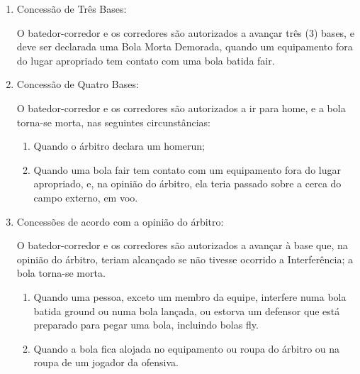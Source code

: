 \begin{multicols}{2}
\begin{enumerate}[label=\alph*)]
	\item  Concess\~ao de Tr\^es Bases: 
	
	O batedor-corredor e os corredores s\~ao autorizados a avan\c{c}ar tr\^es (3) bases, e deve ser declarada uma Bola Morta Demorada, quando um equipamento fora do lugar apropriado tem contato com uma bola batida \gls{fair}. 
	
	\item  Concess\~ao de Quatro Bases: 
	
	O batedor-corredor e os corredores s\~ao autorizados a ir para \gls{home}, e a bola torna-se morta, nas seguintes circunst\^ancias: 
	
	\begin{enumerate}[label=\roman* -]
		\item Quando o \'arbitro declara um \gls{homerun}; 
		\item Quando uma bola \gls{fair} tem contato com um equipamento fora do lugar apropriado, e, na opini\~ao do \'arbitro, ela teria passado sobre a cerca do campo externo, em voo. 
	\end{enumerate}
	\item  Concess\~oes de acordo com a opini\~ao do \'arbitro: 
	
	O batedor-corredor e os corredores s\~ao autorizados a avan\c{c}ar \`a base que, na opini\~ao 
	do \'arbitro, teriam alcan\c{c}ado se n\~ao tivesse ocorrido a Interfer\^encia; a bola torna-se morta. 
	\begin{enumerate}[label=\roman*.]
		\item Quando uma pessoa, exceto um membro da equipe, interfere numa bola batida \gls{ground} ou numa bola lan\c{c}ada, ou estorva um defensor que est\'a preparado para pegar uma bola, incluindo bolas \gls{fly}. 
		\item Quando a bola fica alojada no equipamento ou roupa do \'arbitro ou na roupa de um jogador da ofensiva. 
	\end{enumerate}
\end{enumerate}	
\end{multicols}

